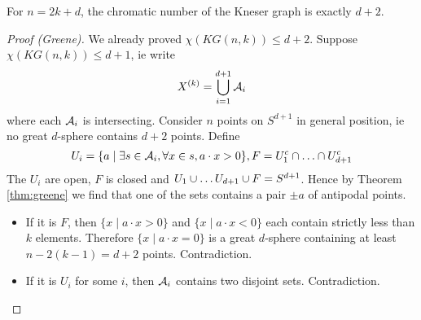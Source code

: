 \documentclass{article}
\begin{document}
\begin{nthm}
  For $n = 2k + d$, the chromatic number of the Kneser graph is exactly $d + 2$.
\end{nthm}
\begin{proof}[Proof (Greene)]
  We already proved $\chi(KG(n, k)) \le d + 2$. Suppose $\chi(KG(n, k)) \le d + 1$, ie write
  $$X^{(k)} = \bigcup_{i = 1}^{d + 1} \mathcal A_i$$
  where each $\mathcal A_i$ is intersecting. Consider $n$ points on $S^{d + 1}$ in general position, ie no great $d$-sphere contains $d + 2$ points. Define
  $$U_i = \{a \mid \exists s \in \mcA_i, \for x \in s, a \cdot x > 0\}, F = U_1^c \inter \dots \inter U_{d + 1}^c$$
  The $U_i$ are open, $F$ is closed and $U_1 \cup \dots U_{d + 1} \cup F = S^{d + 1}$. Hence by Theorem \ref{thm:greene} we find that one of the sets contains a pair $\pm a$ of antipodal points.
  \begin{itemize}
    \item If it is $F$, then $\{x \mid a \cdot x > 0\}$ and $\{x \mid a \cdot x < 0\}$ each contain strictly less than $k$ elements. Therefore $\{x \mid a \cdot x = 0\}$ is a great $d$-sphere containing at least $n - 2(k - 1) = d + 2$ points. Contradiction.
    \item If it is $U_i$ for some $i$, then $\mathcal A_i$ contains two disjoint sets. Contradiction.
  \end{itemize}
\end{proof}

\printindex
\end{document}

